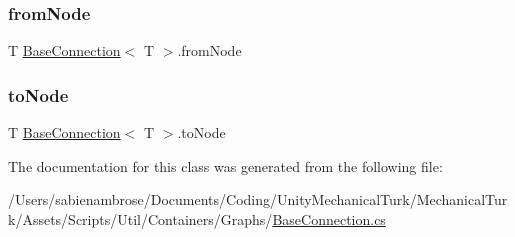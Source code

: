 \mbox{\label{class_base_connection_a30ae67c939f355a10a00539e1db5f6f7}} 
\subsubsection{\texorpdfstring{from\+Node}{fromNode}}
{\footnotesize\ttfamily T \mbox{\hyperlink{class_base_connection}{Base\+Connection}}$<$ T $>$.from\+Node\hspace{0.3cm}{\ttfamily [protected]}}

\mbox{\label{class_base_connection_a2c37f6dab5d3d2779dfe3cf8923495e1}} 
\subsubsection{\texorpdfstring{to\+Node}{toNode}}
{\footnotesize\ttfamily T \mbox{\hyperlink{class_base_connection}{Base\+Connection}}$<$ T $>$.to\+Node\hspace{0.3cm}{\ttfamily [protected]}}



The documentation for this class was generated from the following file\+:\begin{DoxyCompactItemize}
\item 
/\+Users/sabienambrose/\+Documents/\+Coding/\+Unity\+Mechanical\+Turk/\+Mechanical\+Turk/\+Assets/\+Scripts/\+Util/\+Containers/\+Graphs/\mbox{\hyperlink{_base_connection_8cs}{Base\+Connection.\+cs}}\end{DoxyCompactItemize}
